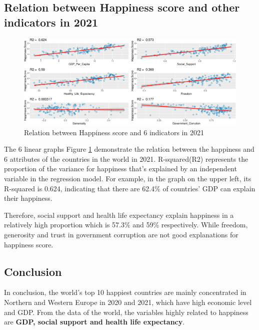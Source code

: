 \documentclass[11pt,a4paper,]{article}
\begin{document}
\hypertarget{relation-between-happiness-score-and-other-indicators-in-2021}{%
\subsection{Relation between Happiness score and other indicators in 2021}\label{relation-between-happiness-score-and-other-indicators-in-2021}}

\begin{figure}
\centering
\includegraphics{Assignment4_files/figure-latex/relation-1.pdf}
\caption{\label{fig:relation}Relation between Happiness score and 6 indicators in 2021}
\end{figure}

The 6 linear graphs Figure \ref{fig:relation} demonstrate the relation between the happiness and 6 attributes of the countries in the world in 2021. R-squared(R2) represents the proportion of the variance for happiness that's explained by an independent variable in the regression model. For example, in the graph on the upper left, its R-squared is 0.624, indicating that there are 62.4\% of countries' GDP can explain their happiness.

Therefore, social support and health life expectancy explain happiness in a relatively high proportion which is 57.3\% and 59\% respectively. While freedom, generosity and trust in government corruption are not good explanations for happiness score.

\hypertarget{conclusion}{%
\subsection{Conclusion}\label{conclusion}}

In conclusion, the world's top 10 happiest countries are mainly concentrated in Northern and Western Europe in 2020 and 2021, which have high economic level and GDP. From the data of the world, the variables highly related to happiness are \textbf{GDP, social support and health life expectancy}.

\printbibliography
\end{document}
